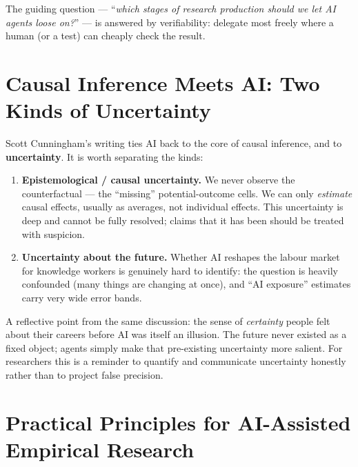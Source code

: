\documentclass[11pt]{article}
\begin{document}
The guiding question --- ``\emph{which stages of research production should we let
AI agents loose on?}'' --- is answered by verifiability: delegate most freely
where a human (or a test) can cheaply check the result.

\section{Causal Inference Meets AI: Two Kinds of Uncertainty}

Scott Cunningham's writing ties AI back to the core of causal inference, and to
\textbf{uncertainty}. It is worth separating the kinds:

\begin{enumerate}[leftmargin=1.4em]
  \item \textbf{Epistemological / causal uncertainty.} We never observe the
  counterfactual --- the ``missing'' potential-outcome cells. We can only
  \emph{estimate} causal effects, usually as averages, not individual effects.
  This uncertainty is deep and cannot be fully resolved; claims that it has been
  should be treated with suspicion.
  \item \textbf{Uncertainty about the future.} Whether AI reshapes the labour
  market for knowledge workers is genuinely hard to identify: the question is
  heavily confounded (many things are changing at once), and ``AI exposure''
  estimates carry very wide error bands.
\end{enumerate}

A reflective point from the same discussion: the sense of \emph{certainty} people
felt about their careers before AI was itself an illusion. The future never
existed as a fixed object; agents simply make that pre-existing uncertainty more
salient. For researchers this is a reminder to quantify and communicate
uncertainty honestly rather than to project false precision.

\section{Practical Principles for AI-Assisted Empirical Research}
\end{document}
